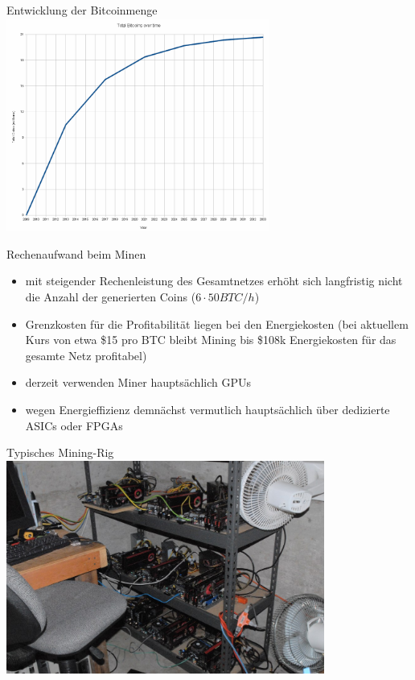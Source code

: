 \documentclass[handout]{beamer} \usepackage[german]{babel}
\begin{document}
\begin{frame}
	{Entwicklung der Bitcoinmenge}
\includegraphics[height=70mm]{btcvortrag/Total_bitcoins_over_time.png}
\end{frame}

\begin{frame}{Rechenaufwand beim Minen}
	\begin{itemize}
		\item mit steigender Rechenleistung des Gesamtnetzes erhöht sich
			langfristig nicht die Anzahl der
			generierten Coins ($6\cdot50BTC/h$)
		\item Grenzkosten für die Profitabilität liegen bei den Energiekosten
			(bei aktuellem Kurs von etwa \$15 pro BTC bleibt Mining bis \$108k
			Energiekosten für das gesamte Netz profitabel)
		\item derzeit verwenden Miner hauptsächlich GPUs
		\item wegen Energieffizienz demnächst vermutlich hauptsächlich über
			dedizierte ASICs oder FPGAs
	\end{itemize}
\end{frame}

\begin{frame}{Typisches Mining-Rig}
\includegraphics[height=70mm]{btcvortrag/mining-shelf.jpg}
\end{frame}
\end{document}
